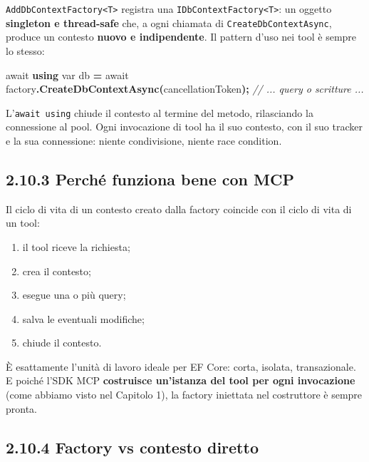 \documentclass[
  italian,
  10pt,
]{book}
\newenvironment{Shaded}{\begin{snugshade}}{\end{snugshade}}
\newcommand{\CommentTok}[1]{\textcolor[rgb]{0.56,0.35,0.01}{\textit{#1}}}
\newcommand{\DataTypeTok}[1]{\textcolor[rgb]{0.13,0.29,0.53}{#1}}
\newcommand{\FunctionTok}[1]{\textcolor[rgb]{0.13,0.29,0.53}{\textbf{#1}}}
\newcommand{\KeywordTok}[1]{\textcolor[rgb]{0.13,0.29,0.53}{\textbf{#1}}}
\newcommand{\NormalTok}[1]{#1}
\newcommand{\OperatorTok}[1]{\textcolor[rgb]{0.81,0.36,0.00}{\textbf{#1}}}
\providecommand{\tightlist}{%
  \setlength{\itemsep}{0pt}\setlength{\parskip}{0pt}}
\begin{document}
\texttt{AddDbContextFactory\textless{}T\textgreater{}} registra una
\texttt{IDbContextFactory\textless{}T\textgreater{}}: un oggetto
\textbf{singleton e thread-safe} che, a ogni chiamata di
\texttt{CreateDbContextAsync}, produce un contesto \textbf{nuovo e
indipendente}. Il pattern d'uso nei tool è sempre lo stesso:

\begin{Shaded}
\begin{Highlighting}[]
\NormalTok{await }\KeywordTok{using} \DataTypeTok{var}\NormalTok{ db }\OperatorTok{=}\NormalTok{ await factory}\OperatorTok{.}\FunctionTok{CreateDbContextAsync}\OperatorTok{(}\NormalTok{cancellationToken}\OperatorTok{);}
\CommentTok{// ... query o scritture ...}
\end{Highlighting}
\end{Shaded}

L'\texttt{await\ using} chiude il contesto al termine del metodo,
rilasciando la connessione al pool. Ogni invocazione di tool ha il suo
contesto, con il suo tracker e la sua connessione: niente condivisione,
niente race condition.

\subsection{2.10.3 Perché funziona bene con
MCP}\label{perchuxe9-funziona-bene-con-mcp}

Il ciclo di vita di un contesto creato dalla factory coincide con il
ciclo di vita di un tool:

\begin{enumerate}
\def\labelenumi{\arabic{enumi}.}
\tightlist
\item
  il tool riceve la richiesta;
\item
  crea il contesto;
\item
  esegue una o più query;
\item
  salva le eventuali modifiche;
\item
  chiude il contesto.
\end{enumerate}

È esattamente l'unità di lavoro ideale per EF Core: corta, isolata,
transazionale. E poiché l'SDK MCP \textbf{costruisce un'istanza del tool
per ogni invocazione} (come abbiamo visto nel Capitolo 1), la factory
iniettata nel costruttore è sempre pronta.

\subsection{2.10.4 Factory vs contesto
diretto}\label{factory-vs-contesto-diretto}
\end{document}
